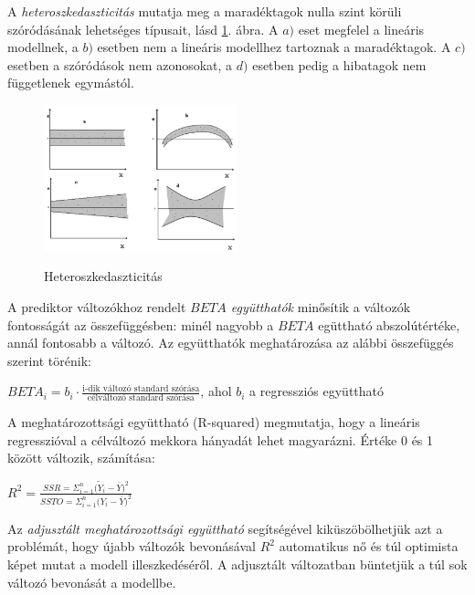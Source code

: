 A \emph{heteroszkedaszticitás} mutatja meg a maradéktagok nulla szint körüli szóródásának lehetséges típusait, lásd \ref{fig:hetero}. ábra. A $a)$ eset megfelel a lineáris modellnek, a $b)$ esetben nem a lineáris modellhez tartoznak a maradéktagok. A $c)$ esetben a szóródások nem azonosokat, a $d)$ esetben pedig a hibatagok nem függetlenek egymástól.

\begin{figure}[h]
  \caption{Heteroszkedaszticitás}
  \centering
  \includegraphics[width=0.5\textwidth]{figures/heteroszkedaszticitas.png} \label{fig:hetero}
\end{figure}

A prediktor változókhoz rendelt \emph{$BETA$ együtthatók} minősítik a változók fontosságát az összefüggésben: minél nagyobb a $BETA$ egüttható abszolútértéke, annál fontosabb a változó. Az együtthatók meghatározása az alábbi összefüggés szerint törénik:

$BETA_i = b_i \cdot \frac{\text{i-dik változó standard szórása}}{\text{célváltozó standard szórása}}$, ahol $b_i$ a regressziós együttható

A meghatározottsági együttható (R-squared) megmutatja, hogy a lineáris regresszióval a célváltozó mekkora hányadát lehet magyarázni. Értéke 0 és 1 között változik, számítása:

$R^2 = \frac{SSR = \Sigma_{i=1}^n\big(\tilde{Y}_i - \bar{Y}  \big)^2}{SSTO = \Sigma_{i=1}^n\big(Y_i - \bar{Y}  \big)^2}$

Az \emph{adjusztált meghatározottsági együttható} segítségével kiküszöbölhetjük azt a problémát, hogy újabb változók bevonásával $R^2$ automatikus nő és túl optimista képet mutat a modell illeszkedéséről. A adjusztált változatban büntetjük a túl sok változó bevonását a modellbe.